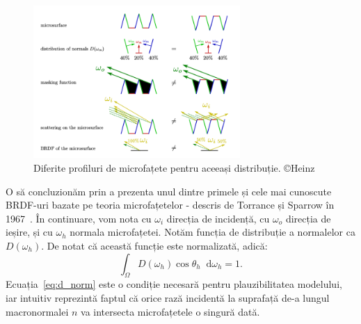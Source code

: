 \documentclass[12pt,a4paper]{report}
\newcommand*\diff{\mathop{}\!\mathrm{d}}
\numberwithin{equation}{section} %
\begin{document}
\begin{figure}[ht]
	\centering
	\includegraphics[width=0.7\textwidth]{pics/masking.png}
	\caption{Diferite profiluri de microfațete pentru aceeași distribuție. \copyright Heinz~\cite{HeitzMasking}}
	\label{fig:microfacet_profiles}
\end{figure}

O să concluzionăm prin a prezenta unul dintre primele și cele mai cunoscute BRDF-uri
bazate pe teoria microfațetelor - descris de Torrance și Sparrow în 1967~\cite{TorranceOld}.
În continuare, vom nota cu $\omega_i$ direcția de incidență, cu $\omega_o$ direcția de ieșire,
și cu $\omega_h$ normala microfațetei. Notăm funcția de distribuție a normalelor ca
$D(\omega_h)$. De notat că această funcție este normalizată, adică:
\begin{equation}\label{eq:d_norm}
	\int_{\Omega} D(\omega_h)\cos \theta_h \diff \omega_h = 1.
\end{equation}
Ecuația~\ref{eq:d_norm} este o condiție necesară pentru plauzibilitatea modelului, iar
intuitiv reprezintă faptul că orice rază incidentă la suprafață de-a lungul macronormalei $n$ va
intersecta microfațetele o singură dată.
\end{document}
